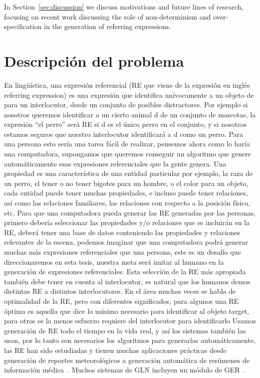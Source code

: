 In Section~\ref{sec:discussion} we discuss motivations and future lines of research, focusing on recent work discussing the role 
of non-determinism and over-specification in the generation of referring expressions. 

\section{Descripci\'on del problema}
\label{sec:intro}

En ling\"u\'{i}stica, una expresi\'on referencial (RE que viene de la expresi\'on en ingl\'es referring expression) es una expresi\'on que identifica un\'ivocamente a un objeto de para un interlocutor, desde un conjunto de posibles distractores. Por ejemplo si nosotros queremos identificar a un cierto animal d de un conjunto de mascotas, la expresi\'on ``el perro'' ser\'a RE si d es el \'unico perro en el conjunto, y si nosotros estamos seguros que nuestro interlocutor identificar\'a a d como un perro. Para una persona esto ser\'ia una tarea f\'acil de realizar, pensemos ahora como lo har\'ia una computadora, supongamos que queremos conseguir un algoritmo que genere autom\'aticamente esas expresiones referenciales que la gente genera. Una propiedad es una caracter\'istica de una entidad particular por ejemplo, la raza de un perro, el tener o no tener bigotes para un hombre, o el color para un objeto, cada entidad puede tener muchas propiedades, e incluso puede tener relaciones, as\'i como las relaciones familiares, las relaciones con respecto a la posici\'on f\'isica, etc. Para que una computadora pueda generar las RE generadas por las personas, primero deber\'ia seleccionar las propiedades y/o relaciones que se incluir\'an en la RE, deber\'a tener una base de datos conteniendo las propiedades y relaciones relevantes de la escena, podemos imaginar que una computadora podr\'a generar muchas m\'as expresiones referenciales que una persona, este es un desaf\'io que direccionaremos en esta tesis, nuestra meta ser\'a imitar al humano en la generaci\'on de expresiones referenciales. Esta selecci\'on de la RE m\'as apropiada tambi\'en debe tener en cuenta al interlocutor, es natural que los humanos demos distintas RE a distintos interlocutores. En el \'area muchas veces se habla de optimalidad de la RE, pero con diferentes significados, para algunos una RE \'optima es aquella que dice lo m\'inimo necesario para identificar al objeto target, para otros es la menos esfuerzo requiere del interlocutor para identificarlo
Usamos generaci\'on de RE todo el tiempo en la vida real, y as\'i los sistemas tambi\'en las usan, por lo tanto son necesarios los algoritmos para generarlas autom\'aticamente, las RE han sido estudiadas y tienen muchas aplicaciones pr\'acticas desde generaci\'on de reportes meteorol\'ogicos a generaci\'on autom\'atica de res\'umenes de informaci\'on m\'edica~\cite{dale2000}. Muchos sistemas de GLN incluyen un m\'odulo de GER~\cite{Mellish2004}.
